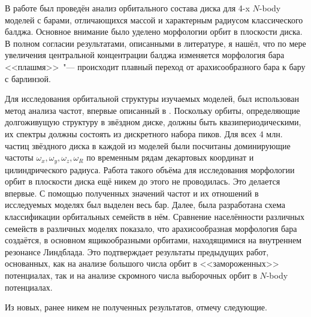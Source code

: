 \documentclass{trlnotes}
\begin{document}
В работе был проведён анализ орбитального состава диска для 4-x $N$-body моделей с барами,
отличающихся массой и характерным радиусом классического балджа. Основное внимание было уделено морфологии орбит в плоскости диска. 
В полном согласии результатами, описанными в литературе, я нашёл, что по мере увеличения центральной концентрации балджа изменяется морфология бара <<плашмя>>~"--- происходит плавный переход от арахисообразного бара к 
бару с барлинзой.

Для исследования орбитальной структуры изучаемых моделей, был использован метод анализа частот, впервые описанный в \citet{binney1982}.
Поскольку орбиты, определяющие долгоживущую структуру в звёздном диске, должны быть квазипериодическими, их спектры должны состоять из
дискретного набора пиков. Для всех 4 млн. частиц звёздного диска в каждой из моделей были посчитаны доминирующие частоты
$ω_x, ω_y, ω_z, ω_R$ по временным рядам декартовых координат и цилиндрического радиуса. Работа такого объёма для исследования морфологии орбит в плоскости диска ещё никем до этого не проводилась. Это делается впервые. 
С помощью полученных значений частот и их отношений в исследуемых моделях был выделен весь бар. Далее, была разработана схема классификации орбитальных семейств в нём.
Сравнение населённости различных семейств в различных моделях показало, что арахисообразная морфология бара создаётся, в 
основном ящикообразными орбитами, находящимися на внутреннем резонансе Линдблада. Это подтверждает результаты предыдущих работ, основанных, как на анализе большого числа орбит в <<замороженных>> потенциалах, так и на анализе скромного числа выборочных орбит в $N$-body потенциалах. 

Из новых, ранее никем не полученных результатов, отмечу следующие.
\end{document}
